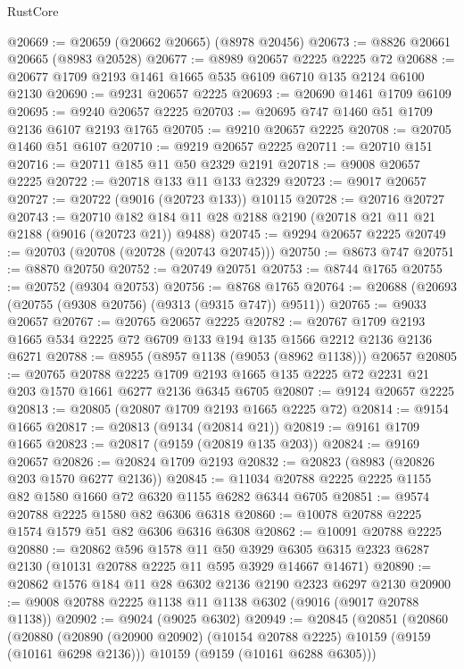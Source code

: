 \begin{lexlean}{RustCore}
\begin{coremodule}
@20669 := @20659 (@20662 @20665) (@8978 @20456)
@20673 := @8826 @20661 @20665 (@8983 @20528)
@20677 := @8989 @20657 @2225 @2225 @72
@20688 := @20677 @1709 @2193 @1461 @1665 @535 @6109 @6710 @135 @2124 @6100 @2130
@20690 := @9231 @20657 @2225
@20693 := @20690 @1461 @1709 @6109
@20695 := @9240 @20657 @2225
@20703 := @20695 @747 @1460 @51 @1709 @2136 @6107 @2193 @1765
@20705 := @9210 @20657 @2225
@20708 := @20705 @1460 @51 @6107
@20710 := @9219 @20657 @2225
@20711 := @20710 @151
@20716 := @20711 @185 @11 @50 @2329 @2191
@20718 := @9008 @20657 @2225
@20722 := @20718 @133 @11 @133 @2329
@20723 := @9017 @20657
@20727 := @20722 (@9016 (@20723 @133)) @10115
@20728 := @20716 @20727
@20743 := @20710 @182 @184 @11 @28 @2188 @2190 (@20718 @21 @11 @21 @2188 (@9016 (@20723 @21)) @9488)
@20745 := @9294 @20657 @2225
@20749 := @20703 (@20708 (@20728 (@20743 @20745)))
@20750 := @8673 @747
@20751 := @8870 @20750
@20752 := @20749 @20751
@20753 := @8744 @1765
@20755 := @20752 (@9304 @20753)
@20756 := @8768 @1765
@20764 := @20688 (@20693 (@20755 (@9308 @20756) (@9313 (@9315 @747)) @9511))
@20765 := @9033 @20657
@20767 := @20765 @20657 @2225
@20782 := @20767 @1709 @2193 @1665 @534 @2225 @72 @6709 @133 @194 @135 @1566 @2212 @2136 @2136 @6271
@20788 := @8955 (@8957 @1138 (@9053 (@8962 @1138))) @20657
@20805 := @20765
    @20788
    @2225
    @1709
    @2193
    @1665
    @135
    @2225
    @72
    @2231
    @21
    @203
    @1570
    @1661
    @6277
    @2136
    @6345
    @6705
@20807 := @9124 @20657 @2225
@20813 := @20805 (@20807 @1709 @2193 @1665 @2225 @72)
@20814 := @9154 @1665
@20817 := @20813 (@9134 (@20814 @21))
@20819 := @9161 @1709 @1665
@20823 := @20817 (@9159 (@20819 @135 @203))
@20824 := @9169 @20657
@20826 := @20824 @1709 @2193
@20832 := @20823 (@8983 (@20826 @203 @1570 @6277 @2136))
@20845 := @11034 @20788 @2225 @2225 @1155 @82 @1580 @1660 @72 @6320 @1155 @6282 @6344 @6705
@20851 := @9574 @20788 @2225 @1580 @82 @6306 @6318
@20860 := @10078 @20788 @2225 @1574 @1579 @51 @82 @6306 @6316 @6308
@20862 := @10091 @20788 @2225
@20880 := @20862
    @596
    @1578
    @11
    @50
    @3929
    @6305
    @6315
    @2323
    @6287
    @2130
    (@10131 @20788 @2225 @11 @595 @3929 @14667 @14671)
@20890 := @20862 @1576 @184 @11 @28 @6302 @2136 @2190 @2323 @6297 @2130
@20900 := @9008 @20788 @2225 @1138 @11 @1138 @6302 (@9016 (@9017 @20788 @1138))
@20902 := @9024 (@9025 @6302)
@20949 := @20845
    (@20851
      (@20860
        (@20880
          (@20890 (@20900 @20902) (@10154 @20788 @2225) @10159 (@9159 (@10161 @6298 @2136)))
          @10159
          (@9159 (@10161 @6288 @6305)))

\end{coremodule}
\end{lexlean}
